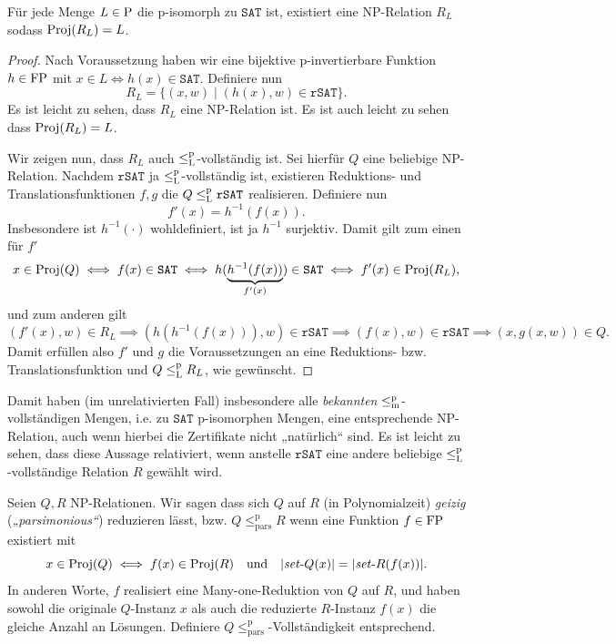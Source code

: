 \begin{observation}[\cite{buhrman_functions_1998}]
    Für jede Menge $L\in \P$ die p-isomorph zu $\mathtt{SAT}$ ist, existiert eine NP-Relation $R_L$ sodass $\Proj(R_L)=L$.
\end{observation}
\begin{proof}
    Nach Voraussetzung haben wir eine bijektive p-invertierbare Funktion $h\in\FP$ mit $x\in L \iff h(x) \in \mathtt{SAT}$.
    Definiere nun
    \[ R_L = \{ (x,w) \mid (h(x), w)\in \mathtt{rSAT}\}. \]
    Es ist leicht zu sehen, dass $R_L$ eine NP-Relation ist. Es ist auch leicht zu sehen dass $\Proj(R_L)=L$.

    Wir zeigen nun, dass $R_L$ auch $\leqlp$-vollständig ist. Sei hierfür $Q$ eine beliebige NP-Relation. Nachdem $\mathtt{rSAT}$ ja $\leqlp$-vollständig ist, existieren Reduktions- und Translationsfunktionen $f,g$ die $Q\leqlp \mathtt{rSAT}$ realisieren.
    Definiere nun
    \[ f'(x) = h^{-1}(f(x)). \]
    Insbesondere ist $h^{-1}(\cdot)$ wohldefiniert, ist ja $h^{-1}$ surjektiv.
    Damit gilt zum einen für $f'$
    \[ x\in \Proj(Q) \iff f(x) \in \mathtt{SAT} \iff h(\underbrace{h^{-1}(f(x))}_{f'(x)}) \in \mathtt{SAT} \iff f'(x) \in \Proj(R_L), \]
    und zum anderen gilt
    \[ (f'(x), w) \in R_L \implies (h(h^{-1}(f(x))), w)\in \mathtt{rSAT} \implies (f(x), w)\in \mathtt{rSAT} \implies (x, g(x, w))\in Q.  \]
    Damit erfüllen also $f'$ und $g$ die Voraussetzungen an eine Reduktions- bzw. Translationsfunktion und $Q\leqlp R_L$, wie gewünscht.
\end{proof}
Damit haben (im unrelativierten Fall) insbesondere alle \emph{bekannten} $\leqmp$-vollständigen Mengen, i.e. zu $\mathtt{SAT}$ p-isomorphen Mengen, eine entsprechende NP-Relation, auch wenn hierbei die Zertifikate nicht „natürlich“ sind.
Es ist leicht zu sehen, dass diese Aussage relativiert, wenn anstelle $\mathtt{rSAT}$ eine andere beliebige $\leqlp$-vollständige Relation $R$ gewählt wird.

\begin{definition}
    Seien $Q, R$ NP-Relationen. Wir sagen dass sich $Q$ auf $R$ (in Polynomialzeit) \emph{geizig} (\emph{„parsimonious“}) reduzieren lässt, bzw. $Q\leq_\mathrm{pars}^\mathrm p R$ wenn eine Funktion $f\in\FP$ existiert mit%
    \[ x\in \Proj(Q) \iff f(x) \in \Proj(R) \quad\text{und}\quad |\fset{}Q(x)|=|\fset{}R(f(x))|. \]
    In anderen Worte, $f$ realisiert eine Many-one-Reduktion von $Q$ auf $R$, und haben sowohl die originale $Q$-Instanz $x$ als auch die reduzierte $R$-Instanz $f(x)$ die gleiche Anzahl an Lösungen.
    Definiere $Q\leq_\mathrm{pars}^\mathrm p$-Vollständigkeit entsprechend.
\end{definition}

